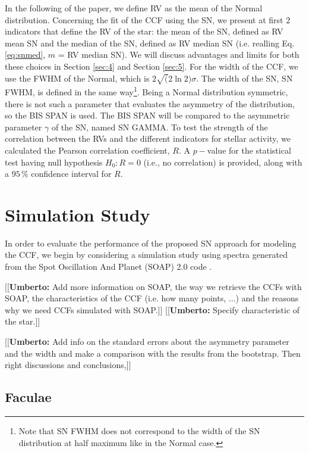 \documentclass[11pt, oneside]{article}
\newcommand{\umberto}[1]{{\color{green}[[\textbf{Umberto: }#1]]}}
\begin{document}
{In the following of the paper, we define RV as the mean of the Normal distribution. Concerning the fit of the CCF using the SN, we present at first $2$ indicators that define the RV of the star: the mean of the SN, defined as RV mean SN and the median of the SN, defined as RV median SN (i.e. realling Eq.\eqref{eq:snmed}, $m$ = RV median SN). We will discuss advantages and limits for both these choices in Section \ref{sec:4} and Section \ref{sec:5}. For the width of the CCF, we use the FWHM of the Normal, which is $2\sqrt(2\ln2)\sigma$. The width of the SN, SN FWHM, is defined in the same way\footnote{Note that SN FWHM does not correspond to the width of the SN distribution at half maximum like in the Normal case.}. Being a Normal distribution symmetric, there is not such a parameter that evaluates the asymmetry of the distribution, so the BIS SPAN is used. The BIS SPAN will be compared to the asymmetric parameter $\gamma$ of the SN, named SN GAMMA. To test the strength of the correlation between the RVs and the different indicators for stellar activity, we calculated the Pearson correlation coefficient, $R$.
A $p-$value for the statistical test having null hypothesis $H_{0}: R=0$ (i.e., no correlation) is provided, along with a $95\,\%$ confidence interval for $R$.

\section{Simulation Study} \label{sec:soap}
In order to evaluate the performance of the proposed SN approach for modeling the CCF, we begin by considering a simulation study using spectra generated from the Spot Oscillation And Planet (SOAP) 2.0 code \citep{Dumusque-2014b}.

\umberto{Add more information on SOAP, the way we retrieve the CCFs with SOAP, the characteristics of the CCF (i.e. how many points, ...) and the reasons why we need CCFs simulated with SOAP.}
\umberto{Specify characteristic of the star.}

\umberto{Add info on the standard errors about the asymmetry parameter and the width and make a comparison with the results from the bootstrap. Then right discussions and conclusions,}

\subsection{Faculae} \label{sec:soap.faculae}

}
\end{document}
